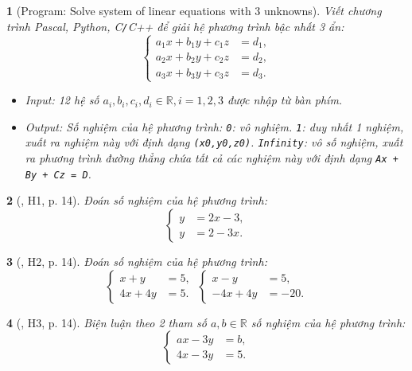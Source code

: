 \documentclass{article}
\newtheorem{baitoan}{}
\begin{document}
\begin{baitoan}[{\sf Program}: Solve system of linear equations with 3 unknowns]
	Viết chương trình {\sf Pascal, Python, C{\tt/}C++} để giải hệ phương trình bậc nhất 3 ẩn:
	\begin{equation*}
		\left\{\begin{split}
			a_1x + b_1y + c_1z &= d_1,\\
			a_2x + b_2y + c_2z &= d_2,\\
			a_3x + b_3y + c_3z &= d_3.
		\end{split}\right.
	\end{equation*}
	\begin{itemize}
		\item {\sf Input}: 12 hệ số $a_i,b_i,c_i,d_i\in\mathbb{R},i = 1,2,3$ được nhập từ bàn phím.
		\item {\sf Output}: Số nghiệm của hệ phương trình: {\tt0}: vô nghiệm. {\tt1}: duy nhất 1 nghiệm, xuất ra nghiệm này với định dạng {\tt(x0,y0,z0)}. {\tt Infinity}: vô số nghiệm, xuất ra phương trình đường thẳng chứa tất cả các nghiệm này với định dạng {\tt Ax + By + Cz = D}.
	\end{itemize}
\end{baitoan}

\begin{baitoan}[\cite{Binh_boi_duong_Toan_9_tap_2}, H1, p. 14]
	Đoán số nghiệm của hệ phương trình:
	\begin{equation*}
		\left\{\begin{split}
			y &= 2x - 3,\\
			y &= 2 - 3x.
		\end{split}\right.
	\end{equation*}
\end{baitoan}

\begin{baitoan}[\cite{Binh_boi_duong_Toan_9_tap_2}, H2, p. 14]
	Đoán số nghiệm của hệ phương trình:
	\begin{equation*}
		\left\{\begin{split}
			x + y &= 5,\\
			4x + 4y &= 5.
		\end{split}\right.\ 
		\left\{\begin{split}
			x - y &= 5,\\
			-4x + 4y &= -20.
		\end{split}\right.
	\end{equation*}
\end{baitoan}

\begin{baitoan}[\cite{Binh_boi_duong_Toan_9_tap_2}, H3, p. 14]
	Biện luận theo 2 tham số $a,b\in\mathbb{R}$ số nghiệm của hệ phương trình:
	\begin{equation*}
		\left\{\begin{split}
			ax - 3y &= b,\\
			4x - 3y &= 5.
		\end{split}\right.
	\end{equation*}
\end{baitoan}
\end{document}

